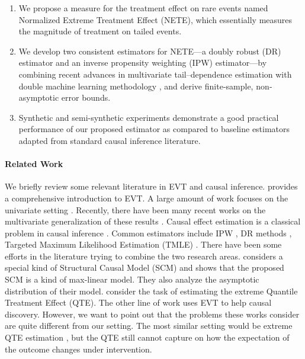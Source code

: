 \documentclass[12pt]{article}
\theoremstyle{plain}
\theoremstyle{definition}
\begin{document}
\begin{enumerate}
    \item We propose a measure for the treatment effect on rare events named Normalized Extreme Treatment Effect (NETE), which essentially measures the magnitude of treatment on tailed events.  
    \item We develop two consistent estimators for NETE—a doubly robust (DR) estimator and an inverse propensity weighting (IPW) estimator—by combining recent advances in multivariate tail–dependence estimation \cite{zhang2023wasserstein} with double machine learning methodology \cite{chernozhukov2018double}, and derive finite‐sample, non‐asymptotic error bounds.
    \item Synthetic and semi-synthetic experiments demonstrate a good practical performance of our proposed estimator as compared to baseline estimators adapted from standard causal inference literature. 
\end{enumerate}

\paragraph{\textbf{Related Work}} We briefly review some relevant literature in EVT and causal inference. \cite{coles2001introduction} provides a comprehensive introduction to EVT. A large amount of work focuses on the univariate setting \citet{davisonModelsExceedancesHigh1990,leadbetterBasisPeaksThreshold1991,pickandsiiiStatisticalInferenceUsing1975,smithExtremeValueAnalysis1989}. Recently, there have been many recent works on the multivariate generalization of these results \cite{avella2022kernel,zhang2023wasserstein}. Causal effect estimation is a classical problem in causal inference \citep{rubin1974estimating}.  
Common estimators include IPW \citep{rosenbaum1983central},  
DR methods \citep{bang2005doubly, kang2007demystifying,chernozhukov2016double,chernozhukov2017double,chernozhukov2018double},    
Targeted Maximum Likelihood Estimation (TMLE) \citep{vanderlaan2006targeted}. There have been some efforts in the literature trying to combine the two research areas.  \citet{NadineMaxLinear} considers a special kind of Structural Causal Model (SCM) and shows that the proposed SCM is a kind of max-linear model. They also analyze the asymptotic distribution of their model. \citet{chernozhukovExtremalQuantilesValueRisk2006,chernozhukov2011inference,zhangExtremalQuantileTreatment2018,deuberEstimationInferenceExtremal2024} consider the task of estimating the extreme Quantile Treatment Effect (QTE). The other line of work \citet{gnecco2021causal,mhalla2020causal,bodikCausalityExtremesTime2023} uses EVT to help causal discovery. However, we want to point out that the problems these works consider are quite different from our setting. The most similar setting would be extreme QTE estimation \cite{chernozhukovExtremalQuantilesValueRisk2006,chernozhukov2011inference,zhangExtremalQuantileTreatment2018,deuberEstimationInferenceExtremal2024}, but the QTE still cannot capture on how the expectation of the outcome changes under intervention. 
\end{document}
